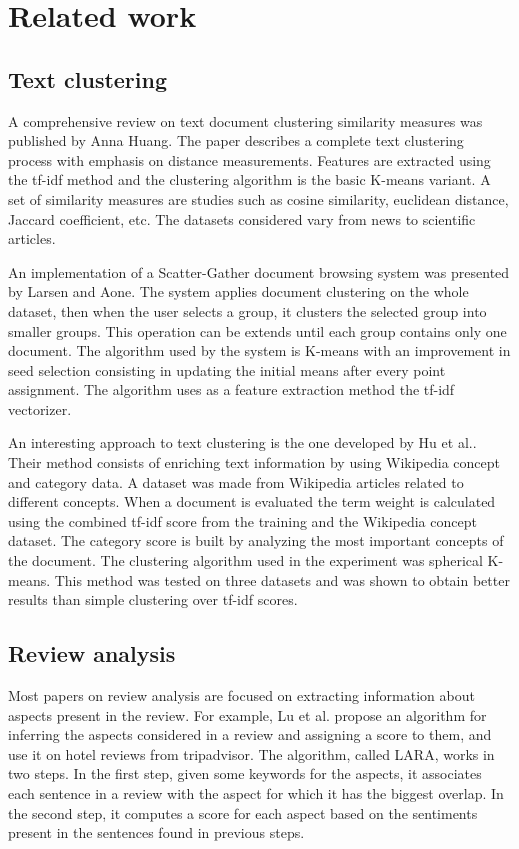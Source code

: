 \documentclass[12pt]{article}
\begin{document}
	\section{Related work}
	
	\subsection{Text clustering}
	A comprehensive review on text document clustering similarity measures was published by Anna Huang\cite{TextClustering}. The paper describes a complete text clustering process with emphasis on distance measurements. Features are extracted using the tf-idf method and the clustering algorithm is the basic K-means variant. A set of similarity measures are studies such as cosine similarity, euclidean distance, Jaccard coefficient, etc. The datasets considered vary from news to scientific articles.
	
	An implementation of a Scatter-Gather document browsing system was presented by Larsen and Aone\cite{ScatterGather}. The system applies document clustering on the whole dataset, then when the user selects a group, it clusters the selected group into smaller groups. This operation can be extends until each group contains only one document. The algorithm used by the system is K-means with an improvement in seed selection consisting in updating the initial means after every point assignment. The algorithm uses as a feature extraction method the tf-idf vectorizer.
	
	An interesting approach to text clustering is the one developed by Hu et al.\cite{WikipediaKmeans}. Their method consists of enriching text information by using Wikipedia concept and category data. A dataset was made from Wikipedia articles related to different concepts. When a document is evaluated the term weight is calculated using the combined tf-idf score from the training and the Wikipedia concept dataset. The category score is built by analyzing the most important concepts of the document. The clustering algorithm used in the experiment was spherical K-means. This method was tested on three datasets and was shown to obtain better results than simple clustering over tf-idf scores.
	
	\subsection{Review analysis}
	Most papers on review analysis are focused on extracting information about aspects present in the review. For example, Lu et al.\cite{LARA} propose an algorithm for inferring the aspects considered in a review and assigning a score to them, and use it on hotel reviews from tripadvisor. The algorithm, called LARA, works in two steps. In the first step, given some keywords for the aspects, it associates each sentence in a review with the aspect for which it has the biggest overlap. In the second step, it computes a score for each aspect based on the sentiments present in the sentences found in previous steps.
	
\end{document}
